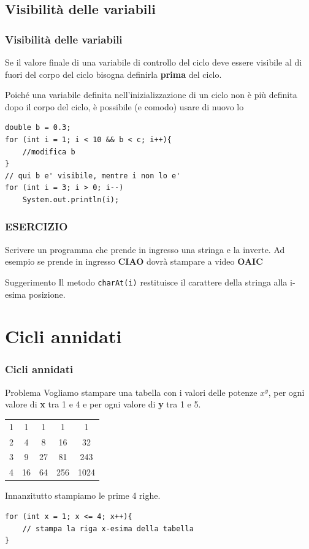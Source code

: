 \subsection*{Visibilità delle variabili}
\begin{frame}[fragile]
\frametitle{Visibilità delle variabili}
\begin{block}{}
Se il valore finale di una variabile di controllo del ciclo deve essere visibile al di fuori del corpo del ciclo bisogna definirla 
\textbf{\alert{prima}} del ciclo.
\end{block}
\begin{block}{}
Poiché una variabile definita nell'inizializzazione di un ciclo non è più definita dopo il corpo del ciclo, è possibile (e comodo)
usare di nuovo lo \textbf{}
\end{block}
\begin{lstlisting}
double b = 0.3;
for (int i = 1; i < 10 && b < c; i++){ 
    //modifica b
}
// qui b e' visibile, mentre i non lo e'
for (int i = 3; i > 0; i--)
    System.out.println(i);
\end{lstlisting}
\end{frame}

\begin{frame}
\frametitle{ESERCIZIO}
\begin{block}{}
Scrivere un programma che prende in ingresso una stringa e la inverte. Ad esempio se prende in ingresso \textbf{CIAO} dovrà stampare a 
video \textbf{OAIC}
\end{block}
\begin{block}{Suggerimento}
Il metodo \texttt{charAt(i)} restituisce il carattere della stringa alla i-esima posizione.
\end{block}
\end{frame}

\section*{Cicli annidati}
\begin{frame}[fragile]
\frametitle{Cicli annidati}
\begin{block}{Problema}
Vogliamo stampare una tabella con i valori delle potenze \textbf{$x^y$}, per ogni valore di \textbf{x} tra 1 e 4 e per ogni valore
di \textbf{y} tra 1 e 5.
\end{block}
\begin{center}
\begin{tabular}{|c c c c c|}
\hline
1 & 1 & 1 & 1 & 1\\
2 & 4 & 8 & 16 & 32\\
3 & 9 & 27 & 81 & 243\\
4 & 16 & 64 & 256 & 1024\\
\hline
\end{tabular}
\end{center}
\pause
\begin{block}{}
Innanzitutto stampiamo le prime 4 righe.
\end{block}
\begin{lstlisting}
for (int x = 1; x <= 4; x++){ 
    // stampa la riga x-esima della tabella
}
\end{lstlisting}
\end{frame}

